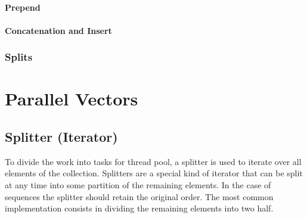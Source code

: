 \paragraph{Prepend}

\paragraph{Concatenation and Insert}



\subsubsection{Splits}



\section{Parallel Vectors}


\subsection{Splitter (Iterator)}
To divide the work into tasks for thread pool, a splitter is used to iterate over all elements of the collection. Splitters are a special kind of iterator that can be split at any time into some partition of the remaining elements. In the case of sequences the splitter should retain the original order. The most common implementation consists in dividing the remaining elements into two half. 

